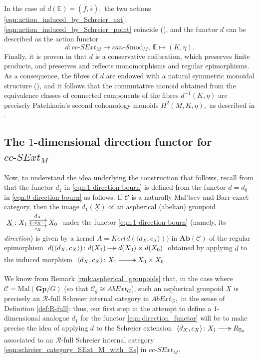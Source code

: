 \documentclass[a4paper]{amsart}
\theoremstyle{plain}
\theoremstyle{definition}
\theoremstyle{remark}
\newcommand{\la}{\langle}
\newcommand{\ra}{\rangle}
\begin{document}
In the case of $d(\mathbb{E})=(\overline{f},\overline{s}),$ the two actions \eqref{eqn:action_induced_by_Schreier_ext}, \eqref{eqn:action_induced_by_Schreier_point} coincide (\cite[Proposition 6.10]{AMR}), and the functor $d$ can be described as the action functor
\begin{equation}
\label{eqn:d_action_guise}
d\colon cc\text{-}SExt_M\longrightarrow can\text{-}\mathcal{S}\mathrm{mod}_M, \  \mathbb{E}\longmapsto (K,\eta).
\end{equation}
Finally, it is proven in \cite[Section 7]{AMR} that $d$ is a conservative cofibration, which preserves finite products, and preserves and reflects monomorphisms and regular epimorphisms. As a consequence, the fibres of $d$ are endowed with a natural symmetric monoidal structure (\cite[Corollary 7.9]{AMR}), and it follows that the commutative monoid obtained from the equivalence classes of connected components of the fibres $d^{-1}(K,\eta)$ are precisely Patchkoria's second cohomology monoids $H^2(M,K,\eta),$ as described in \cite{P-I, P-II}.
\subsection{The $1$-dimensional direction functor for $cc\text{-}SExt_M$}
Now, to understand the idea underlying the construction that follows, recall from \cite{Bourn-Rodelo} that the functor $d_1$ in \eqref{eqn:1-direction-bourn} is defined from the functor $d=d_0$ in \eqref{eqn:0-direction-bourn} as follows. If $\mathcal{C}$ is a naturally Mal'tsev and Barr-exact category, then the image $d_1(\underline{X})$ of an aspherical (abelian) groupoid $\xymatrix{{\underline{X}: X_1} \ar@<.9ex>[r]^-{d_X} \ar@<-.9ex>[r]_-{c_X} &{X_0} \ar[l]|-{e_X}}$ under the functor \eqref{eqn:1-direction-bourn} (namely, its \emph{direction}) is given by a kernel $A=Ker\big(d(\la d_X,c_X\ra)\big)$ in $\mathbf{Ab}(\mathcal{C})$ of the regular epimorphism $\xymatrixcolsep{1pc}\xymatrix{{d(\la d_X,c_X\ra)\colon d(X_1)} \ar@{->>}[r] &{d(X_0)\times d(X_0)}}$ obtained by applying $d$ to the induced morphism $\xymatrix{\la d_X,c_X\ra\colon X_1 \ar@{->>}[r] &{X_0\times X_0.} }$

We know from Remark \ref{rmk:aspherical_groupoids} that, in the case where $\mathcal{C}=\mathrm{Mal}(\mathbf{Gp}/G)$ (so that $\mathcal{C}_g\cong AbExt_G$), such an aspherical groupoid $\underline{X}$ is precisely an $\mathcal{R}$-full Schreier internal category in $AbExt_G,$ in the sense of Definition \ref{def:R-full}: thus, our first step in the attempt to define a $1$-dimensional analogue $d_1$ for the functor \eqref{eqn:direction_functor} will be to make precise the idea of applying $d$ to the Schreier extension $\xymatrixcolsep{1.5pc}\xymatrix{{\la d_X,c_X\ra\colon X_1}\ar@{->>}[r] &{R_{ {\mathbb{E}}_0 }} }$ associated to an $\mathcal{R}$-full Schreier internal category \eqref{eqn:schreier_category_SExt_M_with_Es} in $cc\text{-}SExt_M.$
\end{document}
